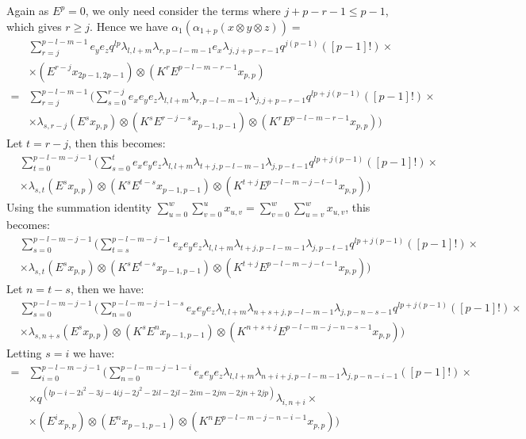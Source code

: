 \documentclass[]{article}
\begin{document}
Again as $E^{p}=0$, we only need consider the terms where $j+p-r-1\leq p-1$, which gives $r\geq j$. Hence we have $\alpha_{1}(\alpha_{1+p}(x\otimes y\otimes z))=$
\begin{align*}
& \sum\limits_{r=j}^{p-l-m-1}e_{y}e_{z}q^{lp}\lambda_{l,l+m}\lambda_{r,p-l-m-1}e_{x}\lambda_{j,j+p-r-1}q^{j(p-1)}([p-1]!)\times\\
&\times(E^{r-j}x_{2p-1,2p-1})\otimes(K^{r}E^{p-l-m-r-1}x_{p,p})\\
=&\sum\limits_{r=j}^{p-l-m-1}\bigg(\sum\limits_{s=0}^{r-j}e_{x}e_{y}e_{z}\lambda_{l,l+m}\lambda_{r,p-l-m-1}\lambda_{j,j+p-r-1}q^{lp+j(p-1)}([p-1]!)\times\\
&\times\lambda_{s,r-j}(E^{s}x_{p,p})\otimes(K^{s}E^{r-j-s}x_{p-1,p-1})\otimes(K^{r}E^{p-l-m-r-1}x_{p,p})\bigg)
\end{align*}
Let $t=r-j$, then this becomes:
\begin{align*}
&\sum\limits_{t=0}^{p-l-m-j-1}\bigg(\sum\limits_{s=0}^{t}e_{x}e_{y}e_{z}\lambda_{l,l+m}\lambda_{t+j,p-l-m-1}\lambda_{j,p-t-1}q^{lp+j(p-1)}([p-1]!)\times\\
&\times\lambda_{s,t}(E^{s}x_{p,p})\otimes(K^{s}E^{t-s}x_{p-1,p-1})\otimes(K^{t+j}E^{p-l-m-j-t-1}x_{p,p})\bigg)
\end{align*}
Using the summation identity $\sum\limits_{u=0}^{w}\sum\limits_{v=0}^{u}x_{u,v}=\sum\limits_{v=0}^{w}\sum\limits_{u=v}^{w}x_{u,v}$, this becomes:
\begin{align*}
&\sum\limits_{s=0}^{p-l-m-j-1}\bigg(\sum\limits_{t=s}^{p-l-m-j-1}e_{x}e_{y}e_{z}\lambda_{l,l+m}\lambda_{t+j,p-l-m-1}\lambda_{j,p-t-1}q^{lp+j(p-1)}([p-1]!)\times\\
&\times\lambda_{s,t}(E^{s}x_{p,p})\otimes(K^{s}E^{t-s}x_{p-1,p-1})\otimes(K^{t+j}E^{p-l-m-j-t-1}x_{p,p})\bigg)
\end{align*}
Let $n=t-s$, then we have:
\begin{align*}
&\sum\limits_{s=0}^{p-l-m-j-1}\bigg(\sum\limits_{n=0}^{p-l-m-j-1-s}e_{x}e_{y}e_{z}\lambda_{l,l+m}\lambda_{n+s+j,p-l-m-1}\lambda_{j,p-n-s-1}q^{lp+j(p-1)}([p-1]!)\times\\
&\times\lambda_{s,n+s}(E^{s}x_{p,p})\otimes(K^{s}E^{n}x_{p-1,p-1})\otimes(K^{n+s+j}E^{p-l-m-j-n-s-1}x_{p,p})\bigg)
\end{align*}
Letting $s=i$ we have:
\begin{align*}
=&\sum\limits_{i=0}^{p-l-m-j-1}\bigg(\sum\limits_{n=0}^{p-l-m-j-1-i}e_{x}e_{y}e_{z}\lambda_{l,l+m}\lambda_{n+i+j,p-l-m-1}\lambda_{j,p-n-i-1}([p-1]!)\times\\
&\times q^{(lp-i-2i^{2}-3j-4ij-2j^{2}-2il-2jl-2im-2jm-2jn+2jp)}\lambda_{i,n+i}\times\\
&\times(E^{i}x_{p,p})\otimes(E^{n}x_{p-1,p-1})\otimes(K^{n}E^{p-l-m-j-n-i-1}x_{p,p})\bigg)
\end{align*} 
\end{document}
